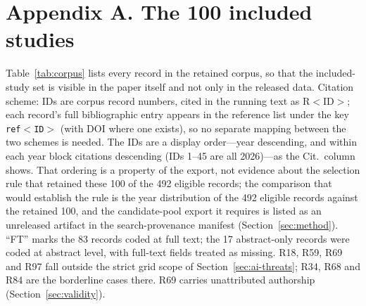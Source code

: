\section*{Appendix A. The 100 included studies}\label{app:corpus}

Table~\ref{tab:corpus} lists every record in the retained corpus, so that the
included-study set is visible in the paper itself and not only in the released
data. Citation scheme: IDs are corpus record numbers, cited in the running text as
R$<$ID$>$; each record's full bibliographic entry appears in the reference list under
the key \texttt{ref$<$ID$>$} (with DOI where one exists), so no separate mapping
between the two schemes is needed. The IDs
are a display order---year descending, and within each year block citations
descending (IDs 1--45 are all 2026)---as the Cit.\ column shows. That ordering is
a property of the export, not evidence about the selection rule that retained
these 100 of the 492 eligible records; the comparison that would establish the
rule is the year distribution of the 492 eligible records against the retained
100, and the candidate-pool export it requires is listed as an unreleased
artifact in the search-provenance manifest (Section~\ref{sec:method}).
``FT'' marks the 83 records coded at full text; the 17 abstract-only records
were coded at abstract level, with full-text fields treated as missing.
R18, R59, R69 and R97 fall outside the strict grid scope of
Section~\ref{sec:ai-threats}; R34, R68 and R84 are the borderline cases there.
R69 carries unattributed authorship (Section~\ref{sec:validity}).

